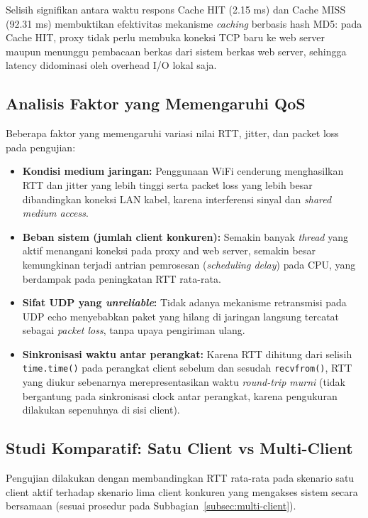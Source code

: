\documentclass[11pt,a4paper]{article}
\begin{document}
\noindent Selisih signifikan antara waktu respons Cache HIT (2.15 ms) dan Cache MISS (92.31 ms) membuktikan efektivitas mekanisme \textit{caching} berbasis hash MD5: pada Cache HIT, proxy tidak perlu membuka koneksi TCP baru ke web server maupun menunggu pembacaan berkas dari sistem berkas web server, sehingga latency didominasi oleh overhead I/O lokal saja.

\subsection{Analisis Faktor yang Memengaruhi QoS}

Beberapa faktor yang memengaruhi variasi nilai RTT, jitter, dan packet loss pada pengujian:

\begin{itemize}[noitemsep]
    \item \textbf{Kondisi medium jaringan:} Penggunaan WiFi cenderung menghasilkan RTT dan jitter yang lebih tinggi serta packet loss yang lebih besar dibandingkan koneksi LAN kabel, karena interferensi sinyal dan \textit{shared medium access}.
    \item \textbf{Beban sistem (jumlah client konkuren):} Semakin banyak \textit{thread} yang aktif menangani koneksi pada proxy and web server, semakin besar kemungkinan terjadi antrian pemrosesan (\textit{scheduling delay}) pada CPU, yang berdampak pada peningkatan RTT rata-rata.
    \item \textbf{Sifat UDP yang \textit{unreliable}:} Tidak adanya mekanisme retransmisi pada UDP echo menyebabkan paket yang hilang di jaringan langsung tercatat sebagai \textit{packet loss}, tanpa upaya pengiriman ulang.
    \item \textbf{Sinkronisasi waktu antar perangkat:} Karena RTT dihitung dari selisih \texttt{time.time()} pada perangkat client sebelum dan sesudah \texttt{recvfrom()}, RTT yang diukur sebenarnya merepresentasikan waktu \textit{round-trip murni} (tidak bergantung pada sinkronisasi clock antar perangkat, karena pengukuran dilakukan sepenuhnya di sisi client).
\end{itemize}

\subsection{Studi Komparatif: Satu Client vs Multi-Client}

Pengujian dilakukan dengan membandingkan RTT rata-rata pada skenario satu client aktif terhadap skenario lima client konkuren yang mengakses sistem secara bersamaan (sesuai prosedur pada Subbagian~\ref{subsec:multi-client}).
\end{document}
